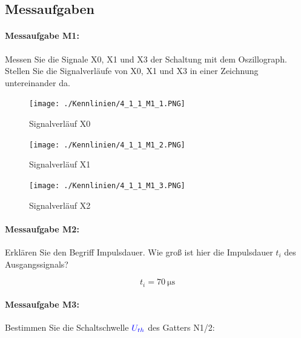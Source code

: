 \documentclass[a4paper,titlepage,parskip]{scrreprt}
\newcommand{\spannung}[1]{\textcolor{blue}{#1}}
\begin{document}
      \subsection{Messaufgaben}
        \paragraph{Messaufgabe M1:} Messen Sie die Signale X0, X1 und X3 der Schaltung mit dem Oszillograph. Stellen Sie die Signalverläufe von X0, X1 und X3 in einer Zeichnung untereinander da.

          \begin{figure}[!htbp]
              \begin{center}
                  \texttt{[image: ./Kennlinien/4\_1\_1\_M1\_1.PNG]}
              \end{center}
              \caption{Signalverläuf X0}
          \end{figure}
          \begin{figure}[!htbp]
              \begin{center}
                  \texttt{[image: ./Kennlinien/4\_1\_1\_M1\_2.PNG]}
              \end{center}
              \caption{Signalverläuf X1}
          \end{figure}
          \begin{figure}[!htbp]
              \begin{center}
                  \texttt{[image: ./Kennlinien/4\_1\_1\_M1\_3.PNG]}
              \end{center}
              \caption{Signalverläuf X2}
          \end{figure}

        \paragraph{Messaufgabe M2:} Erklären Sie den Begriff Impulsdauer. Wie groß ist hier die Impulsdauer $t_i$ des Ausgangssignals?

          \begin{equation*}
            t_i = \SI{70}{\micro\second}
          \end{equation*}

        \paragraph{Messaufgabe M3:} Bestimmen Sie die Schaltschwelle $\spannung{U_{th}}$ des Gatters N1/2:
\end{document}

